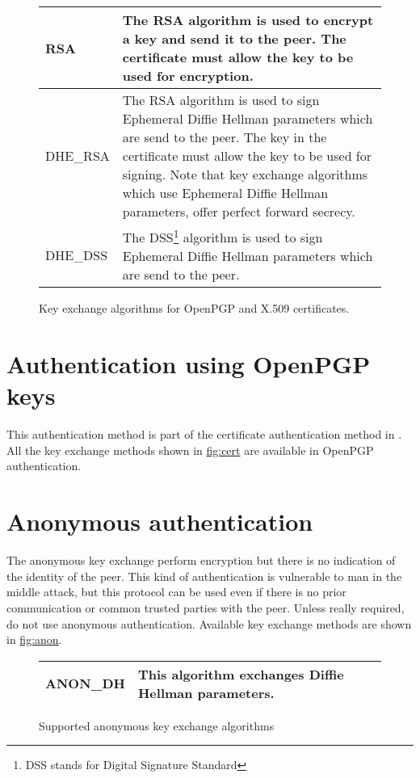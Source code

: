 \begin{figure}[hbtp]
\begin{tabular}{|l|p{9cm}|}
\hline
RSA & The RSA algorithm is used to encrypt a key and send it to the peer.
The certificate must allow the key to be used for encryption.
\\
\hline
DHE\_RSA & The RSA algorithm is used to sign Ephemeral Diffie Hellman
parameters which are send to the peer. The key in the certificate must allow
the key to be used for signing. Note that key exchange algorithms which use
Ephemeral Diffie Hellman parameters, offer perfect forward secrecy.
\\
\hline
DHE\_DSS & The DSS\footnote{DSS stands for Digital Signature Standard} algorithm is used to sign Ephemeral Diffie Hellman
parameters which are send to the peer. 
\\
\hline
\end{tabular}

\caption{Key exchange algorithms for OpenPGP and X.509 certificates.}
\label{fig:cert}

\end{figure}

\section{Authentication using OpenPGP keys}
This authentication method is part of the certificate authentication
method in \gnutls{}. All the key exchange methods shown in \hyperref{figure}{figure }{}{fig:cert} are
available in OpenPGP authentication. 





\section{Anonymous authentication}
The anonymous key exchange perform encryption but there is no indication of the 
identity of the peer. This kind of authentication is vulnerable to man in the middle attack, 
but this protocol can be used even if there is no prior communication or common trusted
parties with the peer. Unless really required, do not use anonymous authentication.
Available key exchange methods are shown in \hyperref{figure}{figure }{}{fig:anon}.

\begin{figure}[hbtp]
\begin{tabular}{|l|p{9cm}|}

\hline
ANON\_DH & This algorithm exchanges Diffie Hellman parameters. 
\\
\hline
\end{tabular}

\caption{Supported anonymous key exchange algorithms}
\label{fig:anon}

\end{figure}

